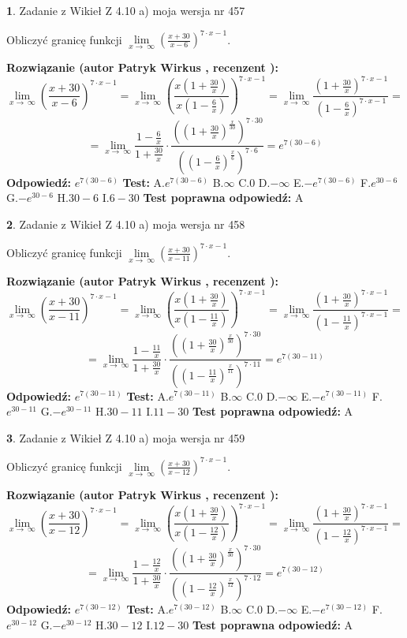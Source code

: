 \documentclass[12pt, a4paper]{article}
\theoremstyle{definition} %
\newtheorem{zad}{}
\newcommand{\zadStart}[1]{\begin{zad}#1\newline}
\newcommand{\zadStop}{\end{zad}}
\newcommand{\rozwStart}[2]{\noindent \textbf{Rozwiązanie (autor #1 , recenzent #2): }\newline}
\newcommand{\rozwStop}{\newline}
\newcommand{\odpStart}{\noindent \textbf{Odpowiedź:}\newline}
\newcommand{\odpStop}{\newline}
\newcommand{\testStart}{\noindent \textbf{Test:}\newline}
\newcommand{\testStop}{\newline}
\newcommand{\kluczStart}{\noindent \textbf{Test poprawna odpowiedź:}\newline}
\newcommand{\kluczStop}{\newline}
\begin{document}
\zadStart{Zadanie z Wikieł Z 4.10 a) moja wersja nr 457}


Obliczyć granicę funkcji  $\lim\limits_{x\to\ \infty}(\frac{x+30}{x-6})^{7\cdot x-1}$.
\zadStop
\rozwStart{Patryk Wirkus}{}
$$\lim\limits_{x\to\ \infty}(\frac{x+30}{x-6})^{7\cdot x-1} = \lim\limits_{x\to\ \infty}(\frac{x(1+\frac{30}{x})}{x(1-\frac{6}{x})})^{7\cdot x-1}=\lim\limits_{x\to\ \infty}\frac{(1+\frac{30}{x})^{7\cdot x-1}}{(1-\frac{6}{x})^{7\cdot x-1}}=$$
$$=\lim\limits_{x\to\ \infty}\frac{1-\frac{6}{x}}{1+\frac{30}{x}}\cdot\frac{((1+\frac{30}{x})^{\frac{x}{30}})^{7\cdot30}}{((1-\frac{6}{x})^{\frac{x}{6}})^{7\cdot6}}=e^{7(30-6)}$$
\rozwStop
\odpStart
$e^{7(30-6)}$
\odpStop
\testStart
A.$e^{7(30-6)}$ B.$\infty$ C.$0$ D.$-\infty$ E.$-e^{7(30-6)}$
F.$e^{30-6}$ G.$-e^{30-6}$
H.$30-6$
I.$6-30$
\testStop
\kluczStart
A
\kluczStop



\zadStart{Zadanie z Wikieł Z 4.10 a) moja wersja nr 458}


Obliczyć granicę funkcji  $\lim\limits_{x\to\ \infty}(\frac{x+30}{x-11})^{7\cdot x-1}$.
\zadStop
\rozwStart{Patryk Wirkus}{}
$$\lim\limits_{x\to\ \infty}(\frac{x+30}{x-11})^{7\cdot x-1} = \lim\limits_{x\to\ \infty}(\frac{x(1+\frac{30}{x})}{x(1-\frac{11}{x})})^{7\cdot x-1}=\lim\limits_{x\to\ \infty}\frac{(1+\frac{30}{x})^{7\cdot x-1}}{(1-\frac{11}{x})^{7\cdot x-1}}=$$
$$=\lim\limits_{x\to\ \infty}\frac{1-\frac{11}{x}}{1+\frac{30}{x}}\cdot\frac{((1+\frac{30}{x})^{\frac{x}{30}})^{7\cdot30}}{((1-\frac{11}{x})^{\frac{x}{11}})^{7\cdot11}}=e^{7(30-11)}$$
\rozwStop
\odpStart
$e^{7(30-11)}$
\odpStop
\testStart
A.$e^{7(30-11)}$ B.$\infty$ C.$0$ D.$-\infty$ E.$-e^{7(30-11)}$
F.$e^{30-11}$ G.$-e^{30-11}$
H.$30-11$
I.$11-30$
\testStop
\kluczStart
A
\kluczStop



\zadStart{Zadanie z Wikieł Z 4.10 a) moja wersja nr 459}


Obliczyć granicę funkcji  $\lim\limits_{x\to\ \infty}(\frac{x+30}{x-12})^{7\cdot x-1}$.
\zadStop
\rozwStart{Patryk Wirkus}{}
$$\lim\limits_{x\to\ \infty}(\frac{x+30}{x-12})^{7\cdot x-1} = \lim\limits_{x\to\ \infty}(\frac{x(1+\frac{30}{x})}{x(1-\frac{12}{x})})^{7\cdot x-1}=\lim\limits_{x\to\ \infty}\frac{(1+\frac{30}{x})^{7\cdot x-1}}{(1-\frac{12}{x})^{7\cdot x-1}}=$$
$$=\lim\limits_{x\to\ \infty}\frac{1-\frac{12}{x}}{1+\frac{30}{x}}\cdot\frac{((1+\frac{30}{x})^{\frac{x}{30}})^{7\cdot30}}{((1-\frac{12}{x})^{\frac{x}{12}})^{7\cdot12}}=e^{7(30-12)}$$
\rozwStop
\odpStart
$e^{7(30-12)}$
\odpStop
\testStart
A.$e^{7(30-12)}$ B.$\infty$ C.$0$ D.$-\infty$ E.$-e^{7(30-12)}$
F.$e^{30-12}$ G.$-e^{30-12}$
H.$30-12$
I.$12-30$
\testStop
\kluczStart
A
\kluczStop
\end{document}
